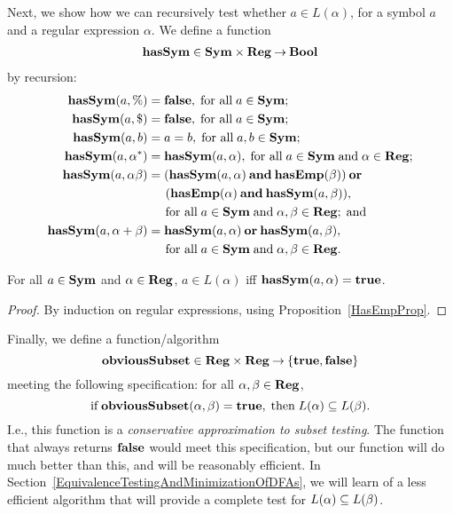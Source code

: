 Next, we show how we can recursively test whether $a\in L(\alpha)$, for
a symbol $a$ and a regular expression $\alpha$.  We define a function
%
%
%
\begin{gather*}
\mathbf{hasSym}\in\mathbf{Sym}\times\mathbf{Reg}\mathbin{\to}\mathbf{Bool}
\end{gather*}
 by recursion:
\begin{align*}
\mathbf{hasSym}(a, \%) &= \mathbf{false} , \;\allowbreak\mbox{for all}\allowbreak\; a\in\mathbf{Sym}; \\
\mathbf{hasSym}(a, \$) &= \mathbf{false} , \;\allowbreak\mbox{for all}\allowbreak\; a\in\mathbf{Sym}; \\
\mathbf{hasSym}(a, b) &= a = b , \;\allowbreak\mbox{for all}\allowbreak\; a,b\in\mathbf{Sym}; \\
\mathbf{hasSym}(a, \alpha^*) &= \mathbf{hasSym}(a, \alpha) , \;\allowbreak\mbox{for all}\allowbreak\;
a\in\mathbf{Sym}\;\allowbreak\mbox{and}\allowbreak\;\alpha\in\mathbf{Reg} ; \\
\mathbf{hasSym}(a, \alpha\beta) &=
(\mathbf{hasSym}(a, \alpha)\mathbin{\mathbf{and}} \mathbf{hasEmp}(\beta)) \mathbin{\mathbf{or}} {} \\
&\quad\;\, (\mathbf{hasEmp}(\alpha)\mathbin{\mathbf{and}} \mathbf{hasSym}(a, \beta)) , \\
&\quad\, \;\allowbreak\mbox{for all}\allowbreak\; a\in\mathbf{Sym}\;\allowbreak\mbox{and}\allowbreak\;\alpha,\beta\in\mathbf{Reg} ; \;\allowbreak\mbox{and}\allowbreak\; \\
\mathbf{hasSym}(a, \alpha+\beta) &=
\mathbf{hasSym}(a, \alpha)\mathbin{\mathbf{or}}\mathbf{hasSym}(a, \beta), \\
&\quad\, \;\allowbreak\mbox{for all}\allowbreak\; a\in\mathbf{Sym}\;\allowbreak\mbox{and}\allowbreak\;\alpha,\beta\in\mathbf{Reg} .
\end{align*}

\begin{proposition}
\label{HasSymProp}
For all $a\in\mathbf{Sym}$ and $\alpha\in\mathbf{Reg}$,
$a\in L(\alpha)$ iff $\mathbf{hasSym}(a,\alpha) = \mathbf{true}$.
\end{proposition}

\begin{proof}
By induction on regular expressions, using Proposition~\ref{HasEmpProp}.
\end{proof}

Finally, we define a function/algorithm
%
%
%
\begin{displaymath}
\mathbf{obviousSubset}\in\mathbf{Reg}\times\mathbf{Reg}\mathbin{\to}\{\mathbf{true},\mathbf{false}\}
\end{displaymath}
meeting the following specification: for all $\alpha,\beta\in\mathbf{Reg}$,
\begin{displaymath}
\allowbreak\mbox{if}\allowbreak\; \mathbf{obviousSubset}(\alpha,\beta)=\mathbf{true},
\;\allowbreak\mbox{then}\allowbreak\; L(\alpha)\subseteq L(\beta) .
\end{displaymath}
I.e., this function is a \emph{conservative approximation to subset testing}.
%
%
The function that always returns $\mathbf{false}$
would meet this specification, but our function will do much better
than this, and will be reasonably efficient. In
Section~\ref{EquivalenceTestingAndMinimizationOfDFAs},
we will learn of a less efficient algorithm that will provide a complete test
for $L(\alpha)\subseteq L(\beta)$.

